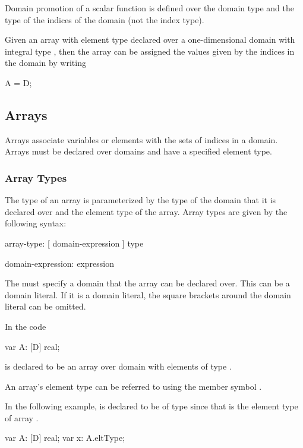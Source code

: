 Domain promotion of a scalar function is defined over the domain type
and the type of the indices of the domain (not the index type).

\begin{example}
Given an array  with element type  declared over a
one-dimensional domain  with integral type , then
the array can be assigned the values given by the indices in the
domain by writing
\begin{chapel}
A = D;
\end{chapel}
\end{example}

\subsection{Arrays}
\label{Arrays}

Arrays associate variables or elements with the sets of indices in a
domain.  Arrays must be declared over domains and have a specified
element type.

\subsubsection{Array Types}
\label{Array_Types}

The type of an array is parameterized by the type of the domain that
it is declared over and the element type of the array.  Array types
are given by the following syntax:
\begin{syntax}
array-type:
  [ domain-expression ] type

domain-expression:
  expression
\end{syntax}
The  must specify a domain that the array can
be declared over.  This can be a domain literal.  If it is a domain
literal, the square brackets around the domain literal can be omitted.

\begin{example}
In the code
\begin{chapel}
var A: [D] real;
\end{chapel}
 is declared to be an array over domain  with
elements of type .
\end{example}

An array's element type can be referred to using the member symbol
.

\begin{example}
In the following example,  is declared to be of type
 since that is the element type of array .
\begin{chapel}
var A: [D] real;
var x: A.eltType;
\end{chapel}
\end{example}

